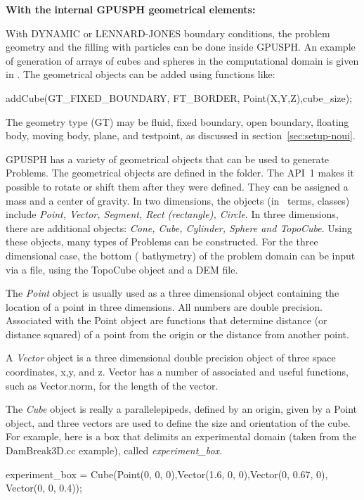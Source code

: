 \documentclass{../GPUSPHtemplate}
\begin{document}
\textbf{With the internal GPUSPH geometrical elements:}

With DYNAMIC or LENNARD-JONES boundary conditions, the
problem geometry and the filling with particles can be done
inside GPUSPH. An example of generation of arrays
of cubes and spheres in the computational domain is given in
.
The geometrical objects can be added using functions like:
\begin{ccode}
addCube(GT_FIXED_BOUNDARY, FT_BORDER,
             Point(X,Y,Z),cube_size);
\end{ccode}
The geometry type (GT) may be fluid, fixed boundary, open boundary, 
floating body, moving body, plane, and testpoint, as discussed in
section~\ref{sec:setup-noui}.

GPUSPH has a variety of geometrical objects that can be used to generate Problems.
The geometrical objects are defined in the  folder.
The  API~1 makes it possible to rotate or shift them after they were defined.
They can be assigned a mass and a center of gravity.
In two dimensions, the objects (in \cpp\ terms, classes) include {\em
Point, Vector, Segment, Rect (rectangle), Circle}. In three
dimensions, there are additional objects: {\em Cone, Cube, Cylinder,
Sphere and TopoCube}. Using these objects, many types of Problems can
be constructed. For the three dimensional case, the bottom (
bathymetry) of the problem domain can be input via a file, using the
TopoCube object and a DEM file.

The {\em Point} object is usually used as a three dimensional object
containing the location of a point in three dimensions. All numbers are
double precision. Associated with the Point object are functions that
determine distance (or distance squared) of a point from the origin or
the distance from another point.


A {\em Vector} object is a three dimensional double precision object of
three space coordinates, x,y, and z. Vector has a number of associated
and useful functions, such as Vector.norm, for the length of the vector.


The {\em Cube} object is really a parallelepipeds, defined by an origin,
given by a Point object, and three vectors are used to define the size
and orientation of the cube. For example, here is a box that delimits
an experimental domain (taken from the DamBreak3D.cc example), called
{\em experiment\_box.}

\noindent experiment\_box = Cube(Point(0, 0, 0),Vector(1.6, 0,
0),Vector(0, 0.67, 0), Vector(0, 0, 0.4));
\end{document}
